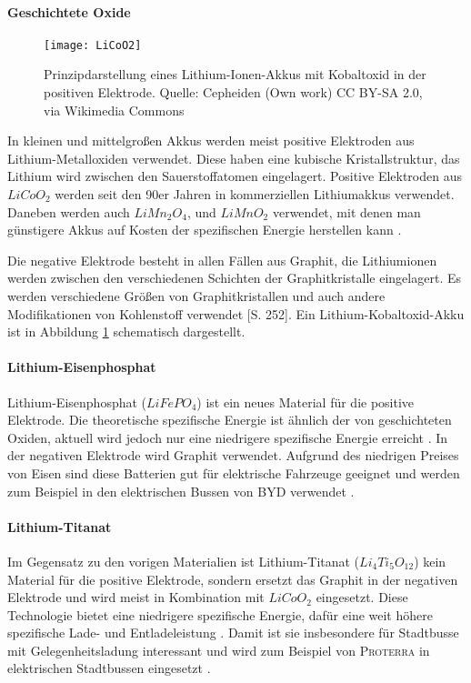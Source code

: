 \paragraph{Geschichtete Oxide}

\begin{figure}\centering
	 \texttt{[image: LiCoO2]}
	 \caption{Prinzipdarstellung eines Lithium-Ionen-Akkus mit Kobaltoxid in der positiven Elektrode. Quelle: Cepheiden (Own work) CC BY-SA 2.0, via Wikimedia Commons}
	 \label{abb_LiCoO2}
\end{figure}

In kleinen und mittelgroßen Akkus werden meist positive Elektroden aus Lithium-Metalloxiden verwendet. Diese haben eine kubische Kristallstruktur, das Lithium wird zwischen den Sauerstoffatomen eingelagert. Positive Elektroden aus $LiCoO_2$ werden seit den 90er Jahren in kommerziellen Lithiumakkus verwendet. Daneben werden auch $LiMn_2O_4$, und $LiMnO_2$ verwendet, mit denen man günstigere Akkus auf Kosten der spezifischen Energie herstellen kann \cite{whittingham2004lithium}. %

Die negative Elektrode besteht in allen Fällen aus Graphit, die Lithiumionen werden zwischen den verschiedenen Schichten der Graphitkristalle eingelagert. Es werden verschiedene Größen von Graphitkristallen und auch andere Modifikationen von Kohlenstoff verwendet \cite{Sterner:2014}[S. 252]. Ein Lithium-Kobaltoxid-Akku ist in Abbildung \ref{abb_LiCoO2} schematisch dargestellt.

\paragraph{Lithium-Eisenphosphat}
Lithium-Eisenphosphat ($LiFePO_4$) ist ein neues Material für die positive Elektrode. Die theoretische spezifische Energie ist ähnlich der von geschichteten Oxiden, aktuell wird jedoch nur eine niedrigere spezifische Energie erreicht \cite{Tie201382}. In der negativen Elektrode wird Graphit verwendet. Aufgrund des niedrigen Preises von Eisen sind diese Batterien gut für elektrische Fahrzeuge geeignet und werden zum Beispiel in den elektrischen Bussen von \textsc{BYD} verwendet \cite{bydSpecs}.

\paragraph{Lithium-Titanat}
Im Gegensatz zu den vorigen Materialien ist Lithium-Titanat ($Li_4Ti_5O_{12}$) kein Material für die positive Elektrode, sondern ersetzt das Graphit in der negativen Elektrode und wird meist in Kombination mit $LiCoO_2$ eingesetzt. Diese Technologie bietet eine niedrigere spezifische Energie, dafür eine weit höhere spezifische Lade- und Entladeleistung \cite{veneri2012charging}. Damit ist sie insbesondere für Stadtbusse mit Gelegenheitsladung interessant und wird zum Beispiel von \textsc{Proterra} in elektrischen Stadtbussen eingesetzt \cite{protCat}.

